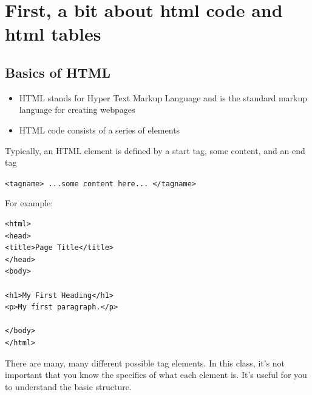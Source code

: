 \documentclass[
  letterpaper,
  DIV=11,
  numbers=noendperiod]{scrartcl}
\providecommand{\tightlist}{%
  \setlength{\itemsep}{0pt}\setlength{\parskip}{0pt}}\usepackage{longtable,booktabs,array}
\begin{document}
\hypertarget{first-a-bit-about-html-code-and-html-tables}{%
\section{First, a bit about html code and html
tables}\label{first-a-bit-about-html-code-and-html-tables}}

\hypertarget{basics-of-html}{%
\subsection{Basics of HTML}\label{basics-of-html}}

\begin{itemize}
\tightlist
\item
  HTML stands for Hyper Text Markup Language and is the standard markup
  language for creating webpages
\item
  HTML code consists of a series of elements
\end{itemize}

\begin{tcolorbox}[enhanced jigsaw, opacitybacktitle=0.6, coltitle=black, colframe=quarto-callout-tip-color-frame, left=2mm, breakable, opacityback=0, colbacktitle=quarto-callout-tip-color!10!white, bottomrule=.15mm, leftrule=.75mm, toptitle=1mm, bottomtitle=1mm, rightrule=.15mm, arc=.35mm, title=\textcolor{quarto-callout-tip-color}{\faLightbulb}\hspace{0.5em}{Tip}, titlerule=0mm, colback=white, toprule=.15mm]

Typically, an HTML element is defined by a start tag, some content, and
an end tag

\texttt{\textless{}tagname\textgreater{}\ ...some\ content\ here...\ \textless{}/tagname\textgreater{}}

\end{tcolorbox}

For example:

\begin{verbatim}
<html>
<head>
<title>Page Title</title>
</head>
<body>

<h1>My First Heading</h1>
<p>My first paragraph.</p>

</body>
</html>
\end{verbatim}

There are many, many different possible tag elements. In this class,
it's not important that you know the specifics of what each element is.
It's useful for you to understand the basic structure.
\end{document}
